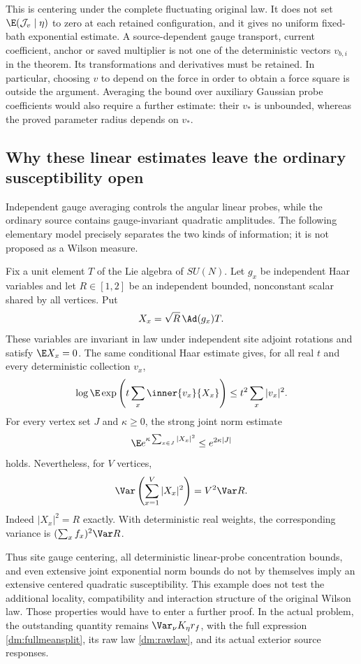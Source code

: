 This is centering under the complete fluctuating original law. It does not set \(\E(\mathcal J_v\mid\eta)\) to zero at each retained configuration, and it gives no uniform fixed-bath exponential estimate. A source-dependent gauge transport, current coefficient, anchor or saved multiplier is not one of the deterministic vectors \(v_{b,i}\) in the theorem. Its transformations and derivatives must be retained. In particular, choosing \(v\) to depend on the force in order to obtain a force square is outside the argument. Averaging the bound over auxiliary Gaussian probe coefficients would also require a further estimate: their \(v_*\) is unbounded, whereas the proved parameter radius depends on \(v_*\).

\subsection{Why these linear estimates leave the ordinary susceptibility open}

Independent gauge averaging controls the angular linear probes, while the ordinary source contains gauge-invariant quadratic amplitudes. The following elementary model precisely separates the two kinds of information; it is not proposed as a Wilson measure.

Fix a unit element \(T\) of the Lie algebra of \(SU(N)\). Let \(g_x\) be independent Haar variables and let \(R\in[1,2]\) be an independent bounded, nonconstant scalar shared by all vertices. Put
\begin{equation}
 X_x=\sqrt R\,\Ad(g_x)T.
 \label{dm:model}
\end{equation}
These variables are invariant in law under independent site adjoint rotations and satisfy \(\E X_x=0\). The same conditional Haar estimate gives, for all real \(t\) and every deterministic collection \(v_x\),
\begin{equation}
 \log\E\exp\left(t\sum_x\inner{v_x}{X_x}\right)
 \le t^2\sum_x|v_x|^2.
 \label{dm:modelcurrent}
\end{equation}
For every vertex set \(J\) and \(\kappa\ge0\), the strong joint norm estimate
\begin{equation}
 \E e^{\kappa\sum_{x\in J}|X_x|^2}
 \le e^{2\kappa|J|}
 \label{dm:modeljoint}
\end{equation}
holds. Nevertheless, for \(V\) vertices,
\begin{equation}
 \Var\left(\sum_{x=1}^V|X_x|^2\right)
 =V^2\Var R.
 \label{dm:modelvariance}
\end{equation}
Indeed \(|X_x|^2=R\) exactly. With deterministic real weights, the corresponding variance is \((\sum_xf_x)^2\Var R\).

Thus site gauge centering, all deterministic linear-probe concentration bounds, and even extensive joint exponential norm bounds do not by themselves imply an extensive centered quadratic susceptibility. This example does not test the additional locality, compatibility and interaction structure of the original Wilson law. Those properties would have to enter a further proof. In the actual problem, the outstanding quantity remains
\(\Var_\nu K_\eta r_f\), with the full expression \eqref{dm:fullmeansplit}, its raw law \eqref{dm:rawlaw}, and its actual exterior source responses.
